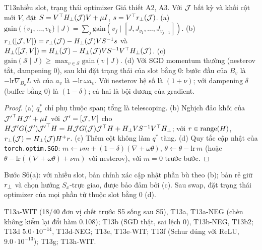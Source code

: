 \begin{namedthm}{T13}{nhiều slot, trạng thái optimizer}
Giả thiết A2, A3. Với $\mathcal{J}$ bất kỳ và khối cột mới $V$, đặt $S=V^{\top} H_\perp(\mathcal{J})V+\mu I$, $s=V^{\top}r_{\perp}(\mathcal{J})$.
(a) $\mathrm{gain}(\{v_1,\dots,v_k\}\mid J)=\sum_j\mathrm{gain}(v_j\mid[J,J_{v_1},\dots,J_{v_{j-1}}])$.
(b) $r_{\perp}([\mathcal{J},V])=r_{\perp}(\mathcal{J})-H_\perp(\mathcal{J})VS^{-1}s$ và $H_\perp([\mathcal{J},V])=H_\perp(\mathcal{J})-H_\perp(\mathcal{J})VS^{-1}V^{\top} H_\perp(\mathcal{J})$.
(c) $\mathrm{gain}(\mathcal S\mid J)\ge\max_{v\in\mathcal S}\mathrm{gain}(v\mid J)$.
(d) Với SGD momentum thường (nesterov tắt, dampening $0$), sau khi đặt trạng thái của slot bằng $0$: bước đầu của $B_v$ là $-\mathrm{lr}\nabla_{B_v}L$ và của $a_v$ là $-\mathrm{lr}\,\omega a_v$. Với nesterov hệ số là $(1+\nu)$; với dampening $\delta$ (buffer bằng $0$) là $(1-\delta)$; cả hai là bội dương của gradient.
\end{namedthm}
\begin{proof}
(a) $q^*_r$ chỉ phụ thuộc span; tổng là telescoping. (b) Nghịch đảo khối của ${\mathcal{J}'}^{\top} H\mathcal{J}'+\mu I$ với $\mathcal{J}'=[\mathcal{J},V]$ cho $H\mathcal{J}'G(\mathcal{J}'){\mathcal{J}'}^{\top} H=H\mathcal{J} G(\mathcal{J})\mathcal{J}^{\top} H+H_\perp VS^{-1}V^{\top} H_\perp$; với $r\in\operatorname{range}(H)$, $r_{\perp}(\mathcal{J})=H_\perp(\mathcal{J})H^+r$. (c) Thêm cột không làm $q^*$ tăng. (d) Quy tắc cập nhật của \texttt{torch.optim.SGD}: $m\leftarrow\nu m+(1-\delta)(\nabla+\omega\theta)$, $\theta\leftarrow\theta-\mathrm{lr}\,m$ (hoặc $\theta-\mathrm{lr}((\nabla+\omega\theta)+\nu m)$ với nesterov), với $m=0$ trước bước.
\end{proof}
\begin{hequa}
Bước S6(a): với nhiều slot, bản chính xác cập nhật phần bù theo (b); bản rẻ giữ $r_{\perp}$ và chọn hướng $S_x$-trực giao, được bảo đảm bởi (c). Sau swap, đặt trạng thái optimizer của mọi phần tử thuộc slot bằng $0$ (d).
\end{hequa}
\begin{kiem}
T13a-WIT (18/40 đơn vị chết trước S5 sống sau S5), T13a, T13a-NEG (chèn không kiểm lại đổi hàm 0.108); T13b (SGD thật, sai lệch $0$), T13b-NEG, T13b2; T13d $5.0\cdot10^{-14}$, T13d-NEG; T13e, T13e-WIT; T13f (Schur đúng với ReLU, $9.0\cdot10^{-13}$); T13g; T13h-WIT.
\end{kiem}

